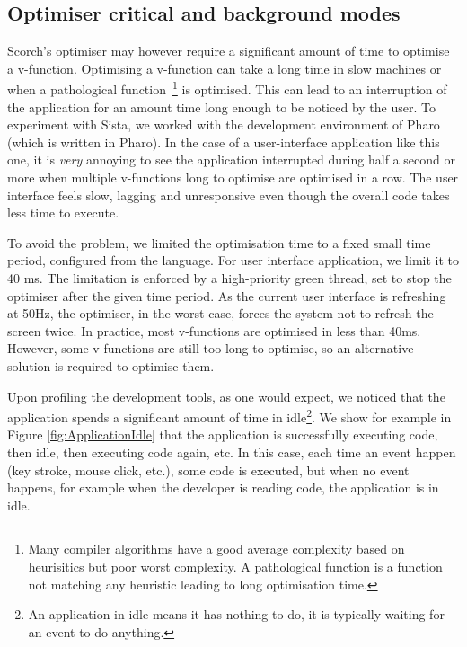 \documentclass[a4paper,12pt,twoside]{../includes/ThesisStyle}
\begin{document}
\subsection{Optimiser critical and background modes}
\label{sec:optModes}

Scorch's optimiser may however require a significant amount of time to optimise a v-function. Optimising a v-function can take a long time in slow machines or when a pathological function~\footnote{Many compiler algorithms have a good average complexity based on heurisitics but poor worst complexity. A pathological function is a function not matching any heuristic leading to long optimisation time.} is optimised. This can lead to an interruption of the application for an amount time long enough to be noticed by the user. To experiment with Sista, we worked with the development environment of Pharo (which is written in Pharo). In the case of a user-interface application like this one, it is \emph{very} annoying to see the application interrupted during half a second or more when multiple v-functions long to optimise are optimised in a row. The user interface feels slow, lagging and unresponsive even though the overall code takes less time to execute.

To avoid the problem, we limited the optimisation time to a fixed small time period, configured from the language. For user interface application, we limit it to 40 ms. The limitation is enforced by a high-priority green thread, set to stop the optimiser after the given time period. As the current user interface is refreshing at 50Hz, the optimiser, in the worst case, forces the system not to refresh the screen twice. In practice, most v-functions are optimised in less than 40ms. However, some v-functions are still too long to optimise, so an alternative solution is required to optimise them.

Upon profiling the development tools, as one would expect, we noticed that the application spends a significant amount of time in idle\footnote{An application in idle means it has nothing to do, it is typically waiting for an event to do anything.}. We show for example in Figure \ref{fig:ApplicationIdle} that the application is successfully executing code, then idle, then executing code again, etc. In this case, each time an event happen (key stroke, mouse click, etc.), some code is executed, but when no event happens, for example when the developer is reading code, the application is in idle.
\end{document}
